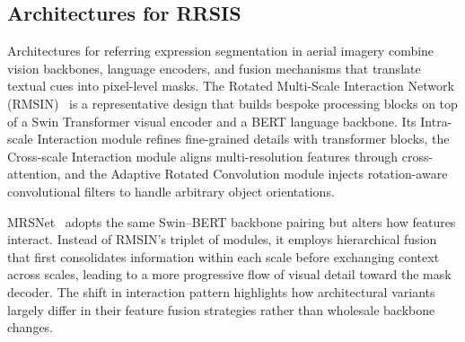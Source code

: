 \subsection{Architectures for RRSIS}

Architectures for referring expression segmentation in aerial imagery combine vision backbones, language encoders, and fusion mechanisms that translate textual cues into pixel-level masks. The Rotated Multi-Scale Interaction Network (RMSIN)~\cite{liu2024rotated} is a representative design that builds bespoke processing blocks on top of a Swin Transformer visual encoder and a BERT language backbone. Its Intra-scale Interaction module refines fine-grained details with transformer blocks, the Cross-scale Interaction module aligns multi-resolution features through cross-attention, and the Adaptive Rotated Convolution module injects rotation-aware convolutional filters to handle arbitrary object orientations.

MRSNet~\cite{yang2024large} adopts the same Swin–BERT backbone pairing but alters how features interact. Instead of RMSIN's triplet of modules, it employs hierarchical fusion that first consolidates information within each scale before exchanging context across scales, leading to a more progressive flow of visual detail toward the mask decoder. The shift in interaction pattern highlights how architectural variants largely differ in their feature fusion strategies rather than wholesale backbone changes.

